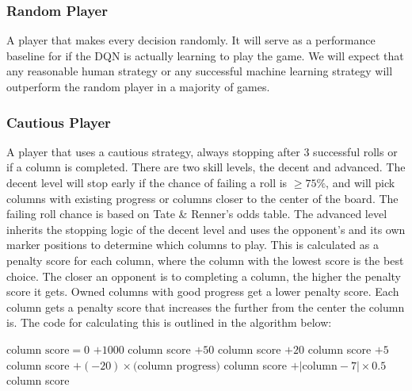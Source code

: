 \documentclass[12pt]{article}
\begin{document}
\begin{thesis}
\subsubsection{Random Player}\label{random-player}

A player that makes every decision randomly.
It will serve as a performance baseline for if the DQN is actually learning to play the game.
We will expect that any reasonable human strategy or any successful machine learning strategy will outperform the random player in a majority of games.

\subsubsection{Cautious Player}\label{cautious-player}

A player that uses a cautious strategy, always stopping after 3 successful rolls or if a column is completed.
There are two skill levels, the decent and advanced.
The decent level will stop early if the chance of failing a roll is \(\ge75\%\), and will pick columns with existing progress or columns closer to the center of the board. The failing roll chance is based on Tate \& Renner's odds table.
The advanced level inherits the stopping logic of the decent level and uses the opponent's and its own marker positions to determine which columns to play.
This is calculated as a penalty score for each column, where the column with the lowest score is the best choice.
The closer an opponent is to completing a column, the higher the penalty score it gets.
Owned columns with good progress get a lower penalty score.
Each column gets a penalty score that increases the further from the center the column is.
The code for calculating this is outlined in the algorithm below:

\begin{algorithm}[H]
\caption{Calculate a penalty score for each column}\label{alg:cap}
\begin{algorithmic}
\Require $\text{column score}=0$
        \State $+1000$ column score
    \EndIf
            \State $+50$ column score
            \State $+20$ column score
            \State $+5$ column score
        \EndIf
    \EndFor
        \State $+(-20)\times(\text{column progress)}$ column score
    \EndIf
    \State $+|\text{column}-7|\times0.5$ column score  
\EndFor
\State {} 
\end{algorithmic}
\end{algorithm}


\end{thesis}
\end{document}
